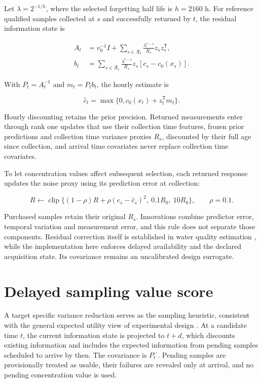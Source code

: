 \documentclass[lineno,pdflatex,sn-apa]{sn-jnl}%
\theoremstyle{thmstyleone}%
\theoremstyle{thmstyletwo}%
\theoremstyle{thmstylethree}%
\begin{document}
Let $\lambda=2^{-1/h}$, where the selected forgetting half life is $h=2160$ h. For reference qualified samples collected at $s$ and successfully returned by $t$, the residual information state is

\begin{align}
A_t &= v_0^{-1}I+\sum_{s\in\mathcal R_t} \frac{\lambda^{t-s}}{R_s}z_sz_s^{\mathsf T},\\
b_t &= \sum_{s\in\mathcal R_t} \frac{\lambda^{t-s}}{R_s}z_s[c_s-c_0(x_s)].
\end{align}

With $P_t=A_t^{-1}$ and $m_t=P_tb_t$, the hourly estimate is

\begin{equation}
\widehat c_t=\max\{0,c_0(x_t)+z_t^{\mathsf T}m_t\}.
\end{equation}

Hourly discounting retains the prior precision. Returned measurements enter through rank one updates that use their collection time features, frozen prior predictions and collection time variance proxies $R_s$, discounted by their full age since collection, and arrival time covariates never replace collection time covariates.

To let concentration values affect subsequent selection, each returned response updates the noise proxy using its prediction error at collection:

\begin{equation}
R\leftarrow\operatorname{clip}\{(1-\rho)R+ \rho(c_s-\widehat c_s)^2,\ 0.1R_0,\ 10R_0\}, \qquad \rho=0.1.
\end{equation}

Purchased samples retain their original $R_s$. Innovations combine predictor error, temporal variation and measurement error, and this rule does not separate those components. Residual correction itself is established in water quality estimation \citep{zhang2019}, while the implementation here enforces delayed availability and the declared acquisition state. Its covariance remains an uncalibrated design surrogate.

\section*{Delayed sampling value score}

A target specific variance reduction serves as the sampling heuristic, consistent with the general expected utility view of experimental design \citep{chaloner1995}. At a candidate time $t$, the current information state is projected to $t+d$, which discounts existing information and includes the expected information from pending samples scheduled to arrive by then. The covariance is $P_t^-$. Pending samples are provisionally treated as usable, their failures are revealed only at arrival, and no pending concentration value is used.
\end{document}
